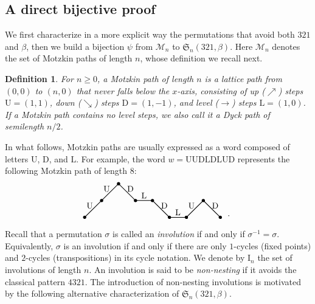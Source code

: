 \documentclass[12pt]{amsart}
\numberwithin{equation}{section}
\theoremstyle{plain}
\newtheorem{definition}[theorem]{Definition}
\def\fS{\mathfrak{S}}
\def\cM{\mathcal{M}}
\def\rU{\mathrm{U}}
\def\rL{\mathrm{L}}
\def\rD{\mathrm{D}}
\def\rI{\mathrm{I}}
\begin{document}
\subsection{A direct bijective proof}
We first characterize in a more explicit way the permutations that avoid both $321$ and $\beta$, then we build a bijection $\psi$ from $\cM_n$ to $\fS_n(321,\beta)$. Here $\cM_n$ denotes the set of Motzkin paths of length $n$, whose definition we recall next.
\begin{definition}\label{def:M-path}
	For $n\ge 0$, a \emph{Motzkin path} of length $n$ is a lattice path from $(0,0)$ to $(n,0)$ that never falls below the $x$-axis, consisting of \emph{up ($\nearrow$)} steps $\rU=(1,1)$, \emph{down ($\searrow$)} steps $\rD=(1,-1)$, and \emph{level ($\rightarrow$)} steps $\rL=(1,0)$. If a Motzkin path contains no level steps, we also call it a \emph{Dyck path} of semilength $n/2$.
\end{definition}

In what follows, Motzkin paths are usually expressed as a word composed of letters $\rU$, $\rD$, and $\rL$. For example, the word $w=\rU\rU\rD\rL\rD\rL\rU\rD$ represents the following Motzkin path of length $8$:
\begin{align*}
		\vcenter{\hbox{\begin{tikzpicture}[line width=0.8pt,scale=0.7]
					\coordinate (O) at (0,0);
					\draw[thick] (O)--++(1,1)--++(1,1)--++(1,-1)--++(1,0)--++(1,-1)--++(1,0)--++(1,1)--++(1,-1);
					\filldraw (O) circle(0.5ex) ++(1,1)circle(0.5ex) ++(1,1)circle(0.5ex) ++(1,-1)circle(0.5ex)
					++(1,0)circle(0.5ex) ++(1,-1)circle(0.5ex) ++(1,0)circle(0.5ex) ++(1,1)circle(0.5ex) ++(1,-1)circle(0.5ex);
					\path (0.3,0.7) node {$\rU$} ++(1,1) node {$\rU$} ++(1.4,0) node {$\rD$} ++(0.8,-0.4) node {$\rL$} ++(1.2,-0.6) node {$\rD$} ++(0.8,-0.4) node {$\rL$} ++(0.8,0.4) node {$\rU$} ++(1.4,0) node {$\rD$} ++(0.8,-0.6) node {.};
		\end{tikzpicture}}}
\end{align*}

Recall that a permutation $\sigma$ is called an \emph{involution} if and only if $\sigma^{-1}=\sigma$. Equivalently, $\sigma$ is an involution if and only if there are only $1$-cycles (fixed points) and $2$-cycles (transpositions) in its cycle notation. We denote by $\rI_n$ the set of involutions of length $n$. An involution is said to be \emph{non-nesting} if it avoids the classical pattern $4321$. The introduction of non-nesting involutions is motivated by the following alternative characterization of $\fS_n(321,\beta)$.
\end{document}
